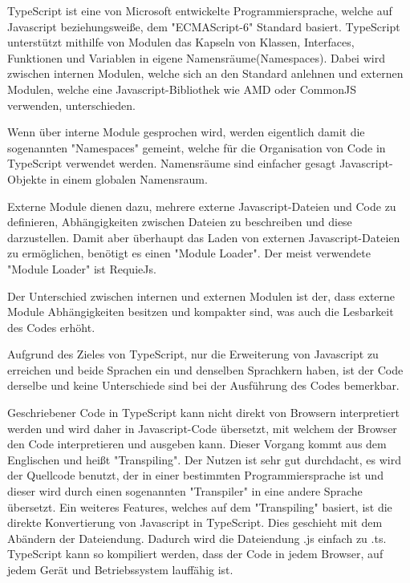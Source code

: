 \label{sec:TypeScript}

TypeScript ist eine von Microsoft entwickelte Programmiersprache, welche auf Javascript beziehungsweiße, dem "ECMAScript-6" Standard basiert. TypeScript unterstützt mithilfe von Modulen das Kapseln von Klassen, Interfaces, Funktionen und Variablen in eigene Namensräume(Namespaces). Dabei wird zwischen internen Modulen, welche sich an den Standard anlehnen und externen Modulen, welche eine Javascript-Bibliothek wie AMD oder CommonJS verwenden, unterschieden. \cite{TypeScript}\cite{ECMAScript6}

Wenn über interne Module gesprochen wird, werden eigentlich damit die sogenannten "Namespaces" gemeint, welche für die Organisation von Code in TypeScript verwendet werden. Namensräume sind einfacher gesagt Javascript-Objekte in einem globalen Namensraum. \cite{IntModules}

Externe Module dienen dazu, mehrere externe Javascript-Dateien und Code zu definieren, Abhängigkeiten zwischen Dateien zu beschreiben und diese darzustellen. Damit aber überhaupt das Laden von externen Javascript-Dateien zu ermöglichen, benötigt es einen "Module Loader". Der meist verwendete "Module Loader" ist RequieJs.\cite{ExtModules}

Der Unterschied zwischen internen und externen Modulen ist der, dass externe Module Abhängigkeiten besitzen und kompakter sind, was auch die Lesbarkeit des Codes erhöht.\cite{TypeScript}





Aufgrund des Zieles von TypeScript, nur die Erweiterung von Javascript zu erreichen und beide Sprachen ein und denselben Sprachkern haben, ist der Code derselbe und keine Unterschiede sind bei der Ausführung des Codes bemerkbar. 
\cite{TypeScript}


Geschriebener Code in TypeScript kann nicht direkt von Browsern interpretiert werden und wird daher in Javascript-Code übersetzt, mit welchem der Browser den Code interpretieren und ausgeben kann. Dieser Vorgang kommt aus dem Englischen und heißt "Transpiling". Der Nutzen ist sehr gut durchdacht, es wird der Quellcode benutzt, der in einer bestimmten Programmiersprache ist und dieser wird durch einen sogenannten "Transpiler" in eine andere Sprache übersetzt. Ein weiteres Features, welches auf dem "Transpiling" basiert, ist die direkte Konvertierung von Javascript in TypeScript. Dies geschieht mit dem Abändern der Dateiendung. Dadurch wird die Dateiendung .js einfach zu .ts. TypeScript kann so kompiliert werden, dass der Code in jedem Browser, auf jedem Gerät und Betriebssystem lauffähig ist. \cite{Differnces}


